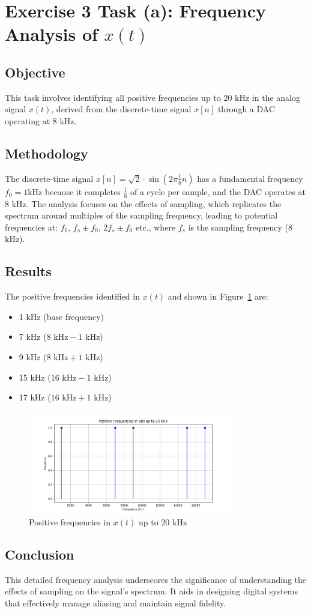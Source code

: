 \item[(a)]
\section*{Exercise 3 Task (a): Frequency Analysis of \(x(t)\)}

\subsection*{Objective}
This task involves identifying all positive frequencies up to 20 kHz in the analog signal \(x(t)\), derived from the discrete-time signal \(x[n]\) through a DAC operating at 8 kHz.

\subsection*{Methodology}
The discrete-time signal \(x[n] = \sqrt{2} \cdot \sin\left(2\pi \frac{1}{8} n\right)\) has a fundamental frequency \(f_0 = 1 \text{kHz}\) because it completes \(\frac{1}{8}\) of a cycle per sample, and the DAC operates at 8 kHz. The analysis focuses on the effects of sampling, which replicates the spectrum around multiples of the sampling frequency, leading to potential frequencies at:
\(f_0\),
\(f_s \pm f_0\),
\(2f_s \pm f_0\)
etc., where \(f_s\) is the sampling frequency (8 kHz).

\subsection*{Results}
The positive frequencies identified in \(x(t)\) and shown in Figure~\ref{fig:exercise3a_frequencies} are:
\begin{itemize}
\item 1 kHz (base frequency)
\item 7 kHz (\(8 \text{ kHz} - 1 \text{ kHz}\))
\item 9 kHz (\(8 \text{ kHz} + 1 \text{ kHz}\))
\item 15 kHz (\(16 \text{ kHz} - 1 \text{ kHz}\))
\item 17 kHz (\(16 \text{ kHz} + 1 \text{ kHz}\))
\end{itemize}

\begin{figure}[h]
    \centering
    \includegraphics[width=0.8\textwidth]{fig/ex3_task_a_frequencies}
    \caption{Positive frequencies in \(x(t)\) up to 20 kHz}
    \label{fig:exercise3a_frequencies}
\end{figure}

\subsection*{Conclusion}
This detailed frequency analysis underscores the significance of understanding the effects of sampling on the signal's spectrum.
It aids in designing digital systems that effectively manage aliasing and maintain signal fidelity.
